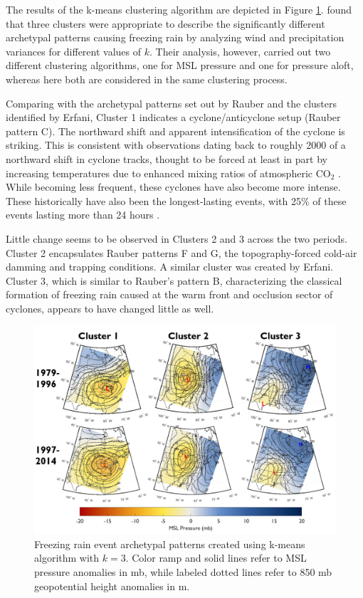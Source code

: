 \documentclass[twocol]{ametsoc}
\begin{document}
The results of the k-means clustering algorithm are depicted in Figure \ref{fig:clusters}. \citet{erfani2012automated} found that three clusters were appropriate to describe the significantly different archetypal patterns causing freezing rain by analyzing wind and precipitation variances for different values of $k$. Their analysis, however, carried out two different clustering algorithms, one for MSL pressure and one for pressure aloft, whereas here both are considered in the same clustering process. 

Comparing with the archetypal patterns set out by Rauber and the clusters identified by Erfani, Cluster 1 indicates a cyclone/anticyclone setup (Rauber pattern C). The northward shift and apparent intensification of the cyclone is striking. This is consistent with observations dating back to roughly 2000 of a northward shift in cyclone tracks, thought to be forced at least in part by increasing temperatures due to enhanced mixing ratios of atmospheric CO$_2$ \citep{mccabe2001trends}. While becoming less frequent, these cyclones have also become more intense. These historically have also been the longest-lasting events, with 25\% of these events lasting more than 24 hours \citep{rauber2001synoptic}. 

Little change seems to be observed in Clusters 2 and 3 across the two periods. Cluster 2 encapsulates Rauber patterns F and G, the topography-forced cold-air damming and trapping conditions. A similar cluster was created by Erfani. Cluster 3, which is similar to Rauber's pattern B, characterizing the classical formation of freezing rain caused at the warm front and occlusion sector of cyclones, appears to have changed little as well.

\begin{figure}
\centering
\includegraphics[width=\textwidth]{Clusters.PNG}
\caption{\label{fig:clusters} Freezing rain event archetypal patterns created using k-means algorithm with $k=3$. Color ramp and solid lines refer to MSL pressure anomalies in mb, while labeled dotted lines refer to 850 mb geopotential height anomalies in m.}
\end{figure}
\end{document}
